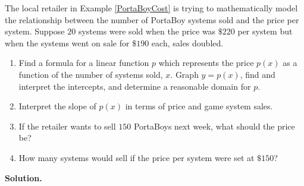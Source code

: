 \documentclass{ximera}
\begin{document}
 
 \begin{example} \label{PortaBoyDemand}  The local retailer in Example \ref{PortaBoyCost} is trying to mathematically model the relationship between the number of PortaBoy systems sold  and the price per system.  Suppose $20$ systems were sold when the price was  $\$220$ per system but when the systems went on sale for  $\$190$ each, sales doubled.
\begin{enumerate}

\item Find a formula for a linear function $p$ which represents the price $p(x)$ as a function of the number of systems sold, $x$. Graph $y = p(x)$, find and interpret the intercepts, and determine a reasonable domain for $p$.

\item Interpret the slope of $p(x)$ in terms of price and game system sales.

\item  If the retailer wants to sell $150$ PortaBoys next week, what should the price be?

\item How many systems would sell if the price per system were set at $\$150$?

\end{enumerate}

\smallskip

{\bf Solution.}  

\begin{enumerate}


\end{enumerate}
\end{example}
\end{document}
